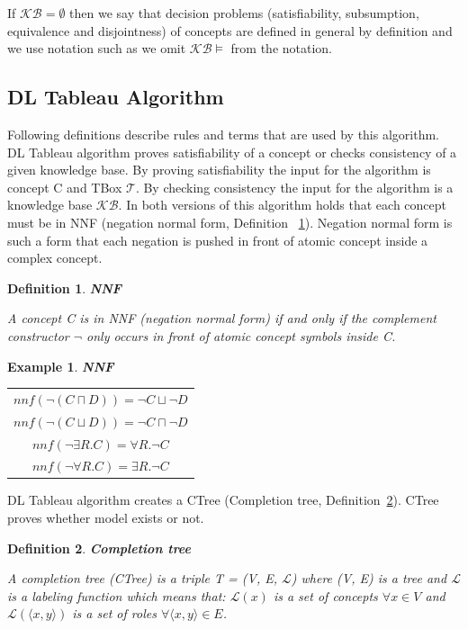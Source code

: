 \documentclass[12pt,a4paper]{article}
\newtheorem{definition}{Definition}[subsection]
\newtheorem{example}{Example}[subsection]
\begin{document}
If $\mathcal{KB} = \emptyset$ then we say that decision problems (satisfiability, subsumption, equivalence and disjointness) of concepts are defined in general by definition and we use notation such as we omit $\mathcal{KB} \models$ from the notation.

\subsection{DL Tableau Algorithm}
Following definitions \citep{baaderHandbook} describe rules and terms that are used by this algorithm. DL Tableau algorithm proves satisfiability of a concept or checks consistency of a given knowledge base. By proving satisfiability the input for the algorithm is concept C and TBox $\mathcal{T}$. By checking consistency the input for the algorithm is a knowledge base $\mathcal{KB}$. In both versions of this algorithm holds that each concept must be in NNF (negation normal form, Definition ~\ref{def:nnf}). Negation normal form is such a form that each negation is pushed in front of atomic concept inside a complex concept. 

\begin{definition}{\textbf{NNF}}
	\label{def:nnf}
	
	A concept C is in NNF (negation normal form) if and only if the complement constructor $\neg$ only occurs in front of atomic concept symbols inside C.
\end{definition}

\begin{example}{\textbf{NNF}}
	\begin{table}[H]
		\centering
		\begin{tabular}{c}
			$ nnf(\neg (C \sqcap D)) = \neg C \sqcup \neg D $ \\
			\addlinespace[0.4cm]
			$ nnf(\neg (C \sqcup D)) = \neg C \sqcap \neg D $ \\
			\addlinespace[0.4cm]
			$ nnf(\neg \exists R.C) = \forall R. \neg C $ \\
			\addlinespace[0.4cm]
			$ nnf(\neg \forall R.C) = \exists R. \neg C $
		\end{tabular}
	\end{table}
	
\end{example}

DL Tableau algorithm creates a CTree (Completion tree, Definition~\ref{def:ctree}). CTree proves whether model exists or not.

\begin{definition}{\textbf{Completion tree}}
	\label{def:ctree}

	A completion tree (CTree) is a triple T = (V, E, $\mathcal{L}$) where (V, E)
	is a tree and $\mathcal{L}$ is a labeling function which means that:
	$\mathcal{L}(x)$ is a set of concepts $\forall x \in V$ and
	$\mathcal{L}(\langle x, y \rangle )$ is a set of roles $\forall \langle x, y \rangle \in E$.	
\end{definition}
\end{document}
